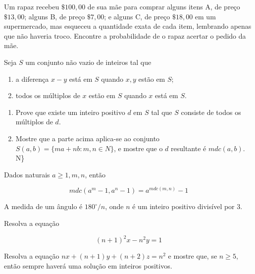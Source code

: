\begin{questao}
  Um rapaz recebeu $\$ 100,00$ de sua mãe para comprar alguns itens
  A, de preço $\$ 13,00$; alguns B, de preço $\$ 7,00$; e alguns
  C, de preço $\$ 18,00$ em um supermercado, mas esqueceu a
  quantidade exata de cada item, lembrando apenas que não haveria
  troco. Encontre a probabilidade de o rapaz acertar o pedido da mãe.
\end{questao}

\begin{questao}
  Seja $S$ um conjunto não vazio de inteiros tal que 
  \begin{enumerate}

    \item a diferença $x-y$ está em $S$ quando $x,y$ estão em
    $S$;

    \item todos os múltiplos de $x$ estão em $S$ quando $x$
    está em $S$.
  \end{enumerate}

  \begin{enumerate}

    \item Prove que existe um inteiro positivo $d$ em $S$ tal que
    $S$ consiste de todos os múltiplos de $d$.

    \item Mostre que a parte acima aplica-se ao conjunto $S(a,b) =
    \{ma+nb: m,n \in N\}$, e mostre que o $d$ resultante é
    $mdc(a,b)$.
    \in N\}
  \end{enumerate}
\end{questao}

\begin{questao}
  Dados naturais $a \geq 1, m,n$, então 

  $$ mdc(a^m-1,a^n-1) = a^{mdc(m,n)}-1$$
\end{questao}

\begin{questao}
  A medida de um ângulo é $180^\circ/n$, onde $n$ é um inteiro
  positivo divisível por $3$. 
\end{questao}

\begin{questao}
  Resolva a equação

  $$ (n+1)^2x-n^2y=1 $$
\end{questao}

\begin{questao}
  Resolva a equação $nx+(n+1)y+(n+2)z = n^2$ e mostre que, se $n
  \geq 5$, então sempre haverá uma solução em inteiros positivos.
\end{questao}

